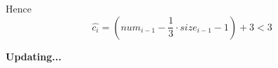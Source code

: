 Hence
\begin{equation*}
    \hat{c_i} = (num_{i-1} - \frac{1}{3} \cdot size_{i-1} - 1) + 3 < 3
\end{equation*}



\centerline{\textbf{Updating...}}

